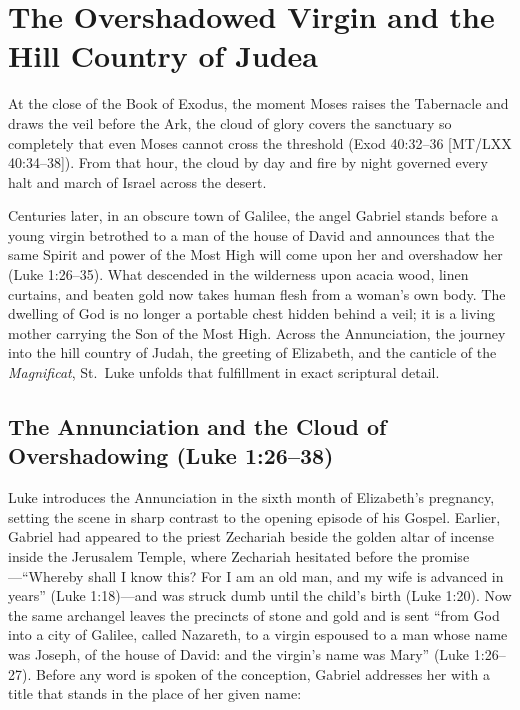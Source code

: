 \section{The Overshadowed Virgin and the Hill Country of Judea}\label{sec:overshadowed-virgin}

At the close of the Book of Exodus, the moment Moses raises the Tabernacle and draws the veil before the Ark, the cloud of glory covers the sanctuary so completely that even Moses cannot cross the threshold (Exod 40:32--36 [MT/LXX 40:34--38]). From that hour, the cloud by day and fire by night governed every halt and march of Israel across the desert.

Centuries later, in an obscure town of Galilee, the angel Gabriel stands before a young virgin betrothed to a man of the house of David and announces that the same Spirit and power of the Most High will come upon her and overshadow her (Luke 1:26--35). What descended in the wilderness upon acacia wood, linen curtains, and beaten gold now takes human flesh from a woman's own body. The dwelling of God is no longer a portable chest hidden behind a veil; it is a living mother carrying the Son of the Most High. Across the Annunciation, the journey into the hill country of Judah, the greeting of Elizabeth, and the canticle of the \textit{Magnificat}, St.\ Luke unfolds that fulfillment in exact scriptural detail.

\subsection{The Annunciation and the Cloud of Overshadowing (Luke 1:26--38)}

Luke introduces the Annunciation in the sixth month of Elizabeth's pregnancy, setting the scene in sharp contrast to the opening episode of his Gospel. Earlier, Gabriel had appeared to the priest Zechariah beside the golden altar of incense inside the Jerusalem Temple, where Zechariah hesitated before the promise---``Whereby shall I know this? For I am an old man, and my wife is advanced in years'' (Luke 1:18)---and was struck dumb until the child's birth (Luke 1:20). Now the same archangel leaves the precincts of stone and gold and is sent ``from God into a city of Galilee, called Nazareth, to a virgin espoused to a man whose name was Joseph, of the house of David: and the virgin's name was Mary'' (Luke 1:26--27). Before any word is spoken of the conception, Gabriel addresses her with a title that stands in the place of her given name:

